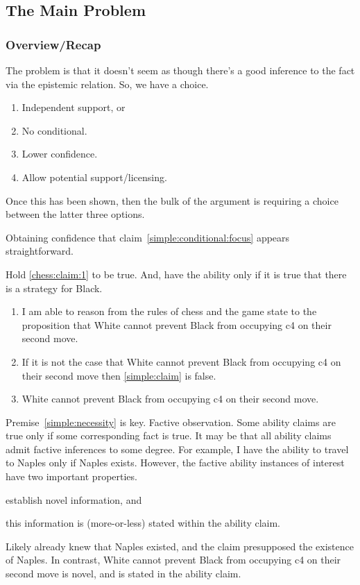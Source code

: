 \documentclass[10pt]{article}
\begin{document}
\subsection{The Main Problem}
\label{sec:problem}

\subsubsection{Overview/Recap}
\label{sec:overviewrecap}

\begin{note}[Overview]
  The problem is that it doesn't seem as though there's a good inference to the fact via the epistemic relation.
  So, we have a choice.
  \begin{enumerate}
  \item Independent support, or
  \item No conditional.
  \item Lower confidence.
  \item Allow potential support/licensing.
  \end{enumerate}
  Once this has been shown, then the bulk of the argument is requiring a choice between the latter three options.
\end{note}

Obtaining confidence that claim~\ref{simple:conditional:focus} appears straightforward.

Hold \ref{chess:claim:1} to be true.
And, have the ability only if it is true that there is a strategy for Black.

\begin{enumerate}
\item\label{simple:claim} I am able to reason from the rules of chess and the game state to the proposition that White cannot prevent Black from occupying c4 on their second move.
\item\label{simple:necessity} If it is not the case that White cannot prevent Black from occupying c4 on their second move then \ref{simple:claim} is false.
\item\label{simple:focus} White cannot prevent Black from occupying c4 on their second move.
\end{enumerate}

Premise~\ref{simple:necessity} is key.
Factive observation.
Some ability claims are true only if some corresponding fact is true.
It may be that all ability claims admit factive inferences to some degree.
For example, I have the ability to travel to Naples only if Naples exists.
However, the factive ability instances of interest have two important properties.
\begin{enumerate*}
\item establish novel information, and
\item this information is (more-or-less) stated within the ability claim.
\end{enumerate*}
Likely already knew that Naples existed, and the claim presupposed the existence of Naples.
In contrast, White cannot prevent Black from occupying c4 on their second move is novel, and is stated in the ability claim.
\end{document}
